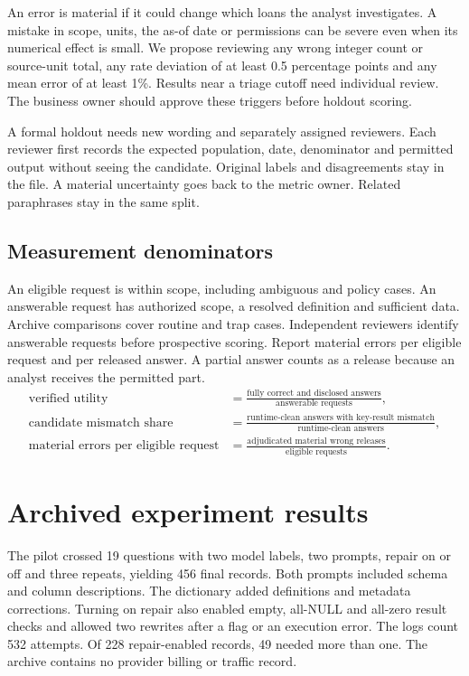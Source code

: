 \documentclass[11pt,a4paper,onecolumn,oneside]{rho-class/rho}
\begin{document}
An error is material if it could change which loans the analyst investigates. A mistake in scope, units, the as-of date or permissions can be severe even when its numerical effect is small. We propose reviewing any wrong integer count or source-unit total, any rate deviation of at least 0.5 percentage points and any mean error of at least 1\%. Results near a triage cutoff need individual review. The business owner should approve these triggers before holdout scoring.

A formal holdout needs new wording and separately assigned reviewers. Each reviewer first records the expected population, date, denominator and permitted output without seeing the candidate. Original labels and disagreements stay in the file. A material uncertainty goes back to the metric owner. Related paraphrases stay in the same split.

\subsection{Measurement denominators}
An eligible request is within scope, including ambiguous and policy cases. An answerable request has authorized scope, a resolved definition and sufficient data. Archive comparisons cover routine and trap cases. Independent reviewers identify answerable requests before prospective scoring. Report material errors per eligible request and per released answer. A partial answer counts as a release because an analyst receives the permitted part.
\[
\begin{aligned}
\text{verified utility} &=
\frac{\text{fully correct and disclosed answers}}{\text{answerable requests}},\\[2pt]
\text{candidate mismatch share} &=
\frac{\text{runtime-clean answers with key-result mismatch}}{\text{runtime-clean answers}},\\[2pt]
\text{material errors per eligible request} &=
\frac{\text{adjudicated material wrong releases}}{\text{eligible requests}}.
\end{aligned}
\]

\clearpage

\section{Archived experiment results}

\label{sec:s6}

The pilot crossed 19 questions with two model labels, two prompts, repair on or off and three repeats, yielding 456 final records. Both prompts included schema and column descriptions. The dictionary added definitions and metadata corrections. Turning on repair also enabled empty, all-NULL and all-zero result checks and allowed two rewrites after a flag or an execution error. The logs count 532 attempts. Of 228 repair-enabled records, 49 needed more than one. The archive contains no provider billing or traffic record.
\end{document}
